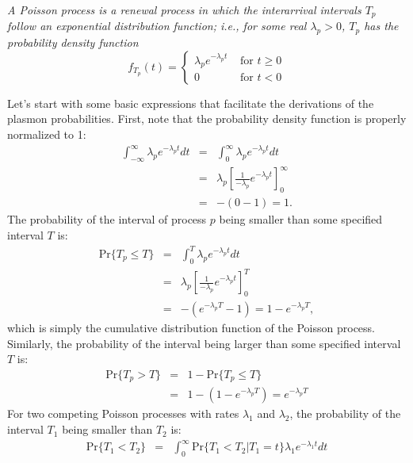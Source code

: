 \begin{refsection}
\begin{adjustwidth}{1em}{0em} 
\textit{A Poisson process is a renewal process in which the interarrival 
intervals $T_p$ follow an exponential distribution function; i.e., for some 
real $\lambda_p > 0$, $T_p$ has the probability density function}
\begin{equation}
f_{T_p} (t) = 
\begin{cases} 
\lambda_p e^{-\lambda_p t} &\text{  for } t \geq 0 \\ 
0 &\text{  for } t < 0
\end{cases}
\end{equation}
\end{adjustwidth} 
Let's start with some basic expressions that facilitate the derivations of the 
plasmon probabilities. First, note that the probability density function is 
properly normalized to 1:
\begin{eqnarray*}
\int_{-\infty}^\infty \lambda_p e^{-\lambda_p t} dt &=& \int_0^\infty \lambda_p e^{-\lambda_p t} dt \\
                     &=& \lambda_p \left[ \frac{1}{-\lambda_p} e^{-\lambda_p t} \right]_0^\infty \\
                     &=& -(0 - 1) = 1.
\end{eqnarray*}
The probability of the interval of process $p$ being smaller than some 
specified interval $T$ is:
\begin{eqnarray}
\text{Pr}\{T_p \leq T\} &=& \int_0^T \lambda_p e^{-\lambda_p t} dt \nonumber \\
                     &=& \lambda_p \left[ \frac{1}{-\lambda_p} e^{-\lambda_p t} \right]_0^T \nonumber \\
                     &=& -(e^{-\lambda_p T} - 1) = 1 - e^{-\lambda_p T},
\end{eqnarray}
which is simply the cumulative distribution function of the Poisson process. 
Similarly, the probability of the interval being larger than some 
specified interval $T$ is:
\begin{eqnarray}
\text{Pr}\{T_p > T\} &=& 1 - \text{Pr}\{T_p \leq T\} \nonumber \\
                     &=& 1 - (1 - e^{-\lambda_p T}) = e^{-\lambda_p T}
\end{eqnarray}
For two competing Poisson processes with rates $\lambda_1$ and 
$\lambda_2$, the probability of the interval $T_1$ being smaller than $T_2$ is:
\begin{eqnarray} 
\text{Pr}\{T_1 < T_2\} &=& \int_0^\infty \text{Pr}\{T_1 < T_2 | T_1 = t \} \lambda_1 e^{-\lambda_1 t} dt \nonumber \\

\end{eqnarray}
\end{refsection}
